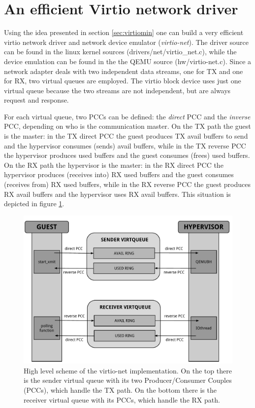\section{An efficient Virtio network driver}
\label{sec:virtionet}
Using the idea presented in section \ref{sec:virtiomin} one can build a very efficient virtio network driver and network device emulator 
(\emph{virtio-net}). The driver source can be found in the linux kernel sources (drivers/net/virtio\_net.c), while the device
emulation can be found in the the QEMU source (hw/virtio-net.c).
Since a network adapter deals with two independent data streams, one for TX and one for RX, two virtual queues are employed. The virtio
block device uses just one virtual queue because the two streams are not independent, but are always request and response.

\vspace{0.5cm}

For each virtual queue, two PCCs can be defined: the \emph{direct} PCC and the \emph{inverse} PCC, depending on who is the communication
master.
On the TX path the guest is the master: in the TX direct PCC the guest produces TX avail buffers to send and the hypervisor consumes (sends)
avail buffers, while in the TX reverse PCC the hypervisor produces used buffers and the guest consumes (frees) used buffers.
On the RX path the hypervisor is the master: in the RX direct PCC the hypervisor produces (receives into) RX used buffers and the guest
consumes (receives from) RX used buffers, while in the RX reverse PCC the guest produces RX avail buffers and the hypervisor uses RX
avail buffers. This situation is depicted in figure \ref{fig:pccs}.

\begin{figure}[bt]
\centering
\includegraphics[scale = 0.55]{pccs.pdf}
\caption{High level scheme of the virtio-net implementation. On the top there is the sender virtual queue with its two Producer/Consumer
	 Couples (PCCs), which handle the TX path. On the bottom there is the receiver virtual queue with its PCCs, which handle the
	 RX path.}
\label{fig:pccs}
\end{figure}


